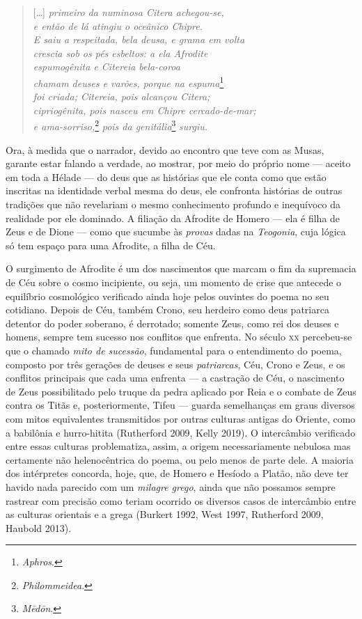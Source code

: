 \begin{verse}
{[}\ldots{}{]} \textit{primeiro da numinosa Citera achegou-se,}\\
\textit{e então de lá atingiu o oceânico Chipre.}\\
\textit{E saiu a respeitada, bela deusa, e grama em volta}\\
\textit{crescia sob os pés esbeltos: a ela Afrodite}\\ %
\textit{espumogênita e Citereia bela-coroa}\\
\textit{chamam deuses e varões, porque na espuma}\footnote{\textit{Aphros}.}\\
\textit{foi criada; Citereia, pois alcançou Citera;}\\
\textit{cipriogênita, pois nasceu em Chipre cercado-de-mar;}\\
\textit{e ama-sorriso,}\footnote{\textit{Philommeidea}.} \textit{pois da genitália}\footnote{\textit{Mēdōn}.} \textit{surgiu.}
\end{verse}

Ora, à medida que o narrador, devido ao encontro que teve com as Musas,
garante estar falando a verdade, ao mostrar, por meio do próprio nome ---
aceito em toda a Hélade --- do deus que as histórias que ele conta como
que estão inscritas na identidade verbal mesma do deus, ele confronta
histórias de outras tradições que não revelariam o mesmo
conhecimento profundo e inequívoco da realidade por ele dominado. A
filiação da Afrodite de Homero --- ela é filha de Zeus e de Dione --- como
que sucumbe às \textit{provas} dadas na \textit{Teogonia}, cuja lógica só tem
espaço para uma Afrodite, a filha de Céu.

O surgimento de Afrodite é um dos nascimentos que marcam o fim da
supremacia de Céu sobre o cosmo incipiente, ou seja, um momento de crise
que antecede o equilíbrio cosmológico verificado ainda hoje pelos
ouvintes do poema no seu cotidiano. Depois de Céu, também Crono, seu
herdeiro como deus patriarca detentor do poder soberano, é derrotado;
somente Zeus, como rei dos deuses e homens, sempre tem sucesso nos
conflitos que enfrenta. No século \textsc{xx} percebeu-se que o chamado \textit{mito de
sucessão}, fundamental para o entendimento do poema, composto por três
gerações de deuses e seus \textit{patriarcas}, Céu, Crono e Zeus, e os
conflitos principais que cada uma enfrenta --- a castração de Céu, o
nascimento de Zeus possibilitado pelo truque da pedra aplicado por Reia
e o combate de Zeus contra os Titãs e, posteriormente, Tifeu --- guarda
semelhanças em graus diversos com mitos equivalentes transmitidos por
outras culturas antigas do Oriente, como a babilônia e hurro-hitita
(Rutherford 2009, Kelly 2019). O intercâmbio verificado entre essas
culturas problematiza, assim, a origem necessariamente nebulosa mas
certamente não helenocêntrica do poema, ou pelo menos de parte dele. A
maioria dos intérpretes concorda, hoje, que, de Homero e Hesíodo a
Platão, não deve ter havido nada parecido com um \textit{milagre grego},
ainda que não possamos sempre rastrear com precisão como teriam ocorrido
os diversos casos de intercâmbio entre as culturas orientais e a grega
(Burkert 1992, West 1997, Rutherford 2009, Haubold 2013).

